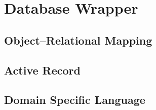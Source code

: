 \section{Database Wrapper}

\subsection{Object–Relational Mapping}

\subsection{Active Record}

\subsection{Domain Specific Language}

